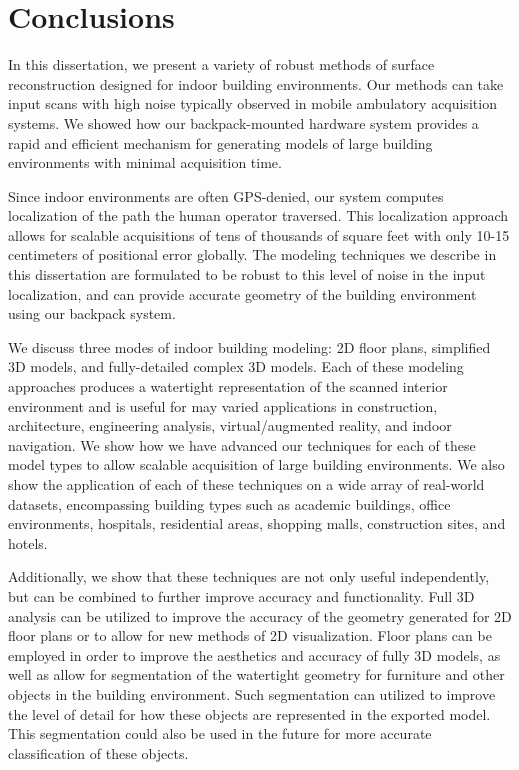 \documentclass[12pt,onecolumn,oneside]{book}
\begin{document}
\chapter{Conclusions}
\label{ch:conclusion}

In this dissertation, we present a variety of robust methods of surface reconstruction designed for indoor building environments.  Our methods can take input scans with high noise typically observed in mobile ambulatory acquisition systems.  We showed how our backpack-mounted hardware system provides a rapid and efficient mechanism for generating models of large building environments with minimal acquisition time.

Since indoor environments are often GPS-denied, our system computes localization of the path the human operator traversed.  This localization approach allows for scalable acquisitions of tens of thousands of square feet with only 10-15 centimeters of positional error globally.  The modeling techniques we describe in this dissertation are formulated to be robust to this level of noise in the input localization, and can provide accurate geometry of the building environment using our backpack system.

We discuss three modes of indoor building modeling:  2D floor plans, simplified 3D models, and fully-detailed complex 3D models.  Each of these modeling approaches produces a watertight representation of the scanned interior environment and is useful for may varied applications in construction, architecture, engineering analysis, virtual/augmented reality, and indoor navigation.  We show how we have advanced our techniques for each of these model types to allow scalable acquisition of large building environments.  We also show the application of each of these techniques on a wide array of real-world datasets, encompassing building types such as academic buildings, office environments, hospitals, residential areas, shopping malls, construction sites, and hotels.

Additionally, we show that these techniques are not only useful independently, but can be combined to further improve accuracy and functionality.  Full 3D analysis can be utilized to improve the accuracy of the geometry generated for 2D floor plans or to allow for new methods of 2D visualization.  Floor plans can be employed in order to improve the aesthetics and accuracy of fully 3D models, as well as allow for segmentation of the watertight geometry for furniture and other objects in the building environment.  Such segmentation can utilized to improve the level of detail for how these objects are represented in the exported model.  This segmentation could also be used in the future for more accurate classification of these objects.  
\end{document}
